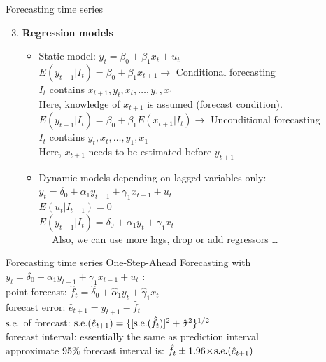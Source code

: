 \documentclass{beamer}
\begin{document}
\begin{frame}{Forecasting time series}
\begin{enumerate}
\setcounter{enumi}{2}
\item \textbf{Regression models}
\begin{itemize}
\item Static model: $y_t=\beta_0 + \beta_1 x_t + u_t$\\
$E(y_{t+1}|I_t)=\beta_0 + \beta_1 x_{t+1} \rightarrow$ Conditional forecasting\\
$I_t$ contains $x_{t+1}, y_t, x_t,\dots, y_1, x_1$\\
Here, knowledge of $x_{t+1}$ is assumed (forecast condition).\\
\medskip
$E(y_{t+1}|I_t)=\beta_0 + \beta_1 E(x_{t+1}|I_t) \rightarrow$ Unconditional forecasting\\
$I_t$ contains $y_t, x_t,\dots, y_1, x_1$\\
Here, $x_{t+1}$ needs to be estimated before $y_{t+1}$\\

\vspace{0.5cm}
\item Dynamic models depending on lagged variables only:\\
$y_t=\delta_0+\alpha_1 y_{t-1} + \gamma_1 x_{t-1} + u_t$\\
$E(u_t|I_{t-1})=0$\\
$E(y_{t+1}|I_t)=\delta_0+\alpha_1 y_{t} + \gamma_1 x_{t}$\\
~~ Also, we can use more lags, drop or add regressors \dots 
\end{itemize}
\end{enumerate}
\end{frame}


\begin{frame}{Forecasting time series}
One-Step-Ahead Forecasting with \\
\vspace{0.2cm}
$y_t=\delta_0+\alpha_1 y_{t-1} + \gamma_1 x_{t-1} + u_t $ :\\
\vspace{0.8cm}
point forecast: $\hat{f}_t = \hat{\delta}_0 + \hat{\alpha}_1 y_t + \hat{\gamma}_1 x_t$\\
\vspace{0.2cm}
forecast error: $\hat{e}_{t+1}=y_{t+1}-\hat{f}_t $\\
\vspace{0.2cm}
$\textnormal{s.e.}$ of forecast: $\textnormal{s.e.}(\hat{e}_{t+1})= \{ [\textnormal{s.e.} (\hat{f}_t)]^2+\hat{\sigma}^2\}^{1/2}$  \\
\vspace{0.82cm}
forecast interval: essentially the same as prediction interval \\
\vspace{0.2cm}
approximate 95\% forecast interval is:  $\hat{f}_t \pm 1.96 \! \times \! \textnormal{s.e.}(\hat{e}_{t+1})$
\end{frame}
\end{document}
